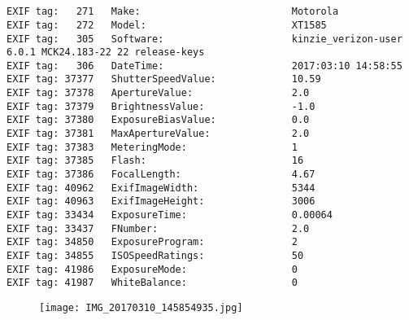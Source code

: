 \section{\protect{}}
\noindent 
\noindent
\begin{lstlisting}
EXIF tag:   271   Make:                          Motorola
EXIF tag:   272   Model:                         XT1585
EXIF tag:   305   Software:                      kinzie_verizon-user 6.0.1 MCK24.183-22 22 release-keys
EXIF tag:   306   DateTime:                      2017:03:10 14:58:55
EXIF tag: 37377   ShutterSpeedValue:             10.59
EXIF tag: 37378   ApertureValue:                 2.0
EXIF tag: 37379   BrightnessValue:               -1.0
EXIF tag: 37380   ExposureBiasValue:             0.0
EXIF tag: 37381   MaxApertureValue:              2.0
EXIF tag: 37383   MeteringMode:                  1
EXIF tag: 37385   Flash:                         16
EXIF tag: 37386   FocalLength:                   4.67
EXIF tag: 40962   ExifImageWidth:                5344
EXIF tag: 40963   ExifImageHeight:               3006
EXIF tag: 33434   ExposureTime:                  0.00064
EXIF tag: 33437   FNumber:                       2.0
EXIF tag: 34850   ExposureProgram:               2
EXIF tag: 34855   ISOSpeedRatings:               50
EXIF tag: 41986   ExposureMode:                  0
EXIF tag: 41987   WhiteBalance:                  0

\end{lstlisting}
\clearpage
\begin{figure}
\raggedleft
\texttt{[image: IMG\_20170310\_145854935.jpg]}
\end{figure}


\clearpage
